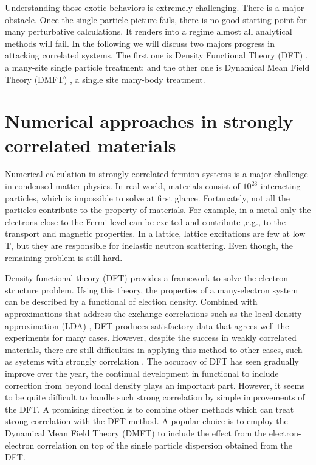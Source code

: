 Understanding those exotic behaviors is extremely challenging. There is a major
obstacle. Once the single particle picture fails, there
is no good starting point for many perturbative calculations. It renders
into a regime almost all analytical methods will fail. In the following we 
will discuss two majors progress in attacking correlated systems. The first one 
is Density Functional Theory (DFT)\cite{PhysRev.136.B864,PhysRev.140.A1133} , 
a many-site single particle treatment; 
and the other one is Dynamical Mean Field Theory (DMFT) \cite{RevModPhys.68.13,PhysRevB.45.6479,Jarrell-1992}, 
a single site many-body treatment. 

\section{Numerical approaches in strongly correlated materials}
Numerical calculation in strongly correlated fermion systems is a major 
challenge in condensed matter physics. In real world, materials consist of 
$10^{23}$ interacting particles, which is impossible to solve at first glance. 
Fortunately, not all the particles contribute to the property of materials. For 
example, in a metal only the electrons close to the Fermi level can be excited 
and contribute ,e.g., to the transport and magnetic properties. In a lattice, 
lattice excitations are few at low T, but they are responsible for inelastic 
neutron scattering. Even though, the remaining problem is still hard. 

Density functional theory (DFT)\cite{PhysRev.136.B864,PhysRev.140.A1133} 
provides a framework to solve the 
electron structure problem. Using this theory, the properties of a many-electron
system can be described by a functional of election density. Combined with 
approximations that address the exchange-correlations such as the local density 
approximation (LDA) \cite{lundqvist1983}, DFT produces satisfactory data that agrees well the 
experiments for many cases. However, despite the success in weakly correlated 
materials, there are still difficulties in applying this method to other 
cases, such as systems with strongly correlation \cite{0953-8984-9-35-010}. 
The accuracy of DFT has seen gradually improve over the year, the continual
development in functional to include correction from beyond local density 
plays an important part. However, it seems to be quite
difficult to handle such strong correlation by simple improvements of the 
DFT. A promising direction is to combine other methods which can treat
strong correlation with the DFT method. A popular choice is to employ 
the Dynamical Mean Field Theory\citep{RevModPhys.68.13,PhysRevB.45.6479} (DMFT)
to include the effect from the electron-electron
correlation on top of the single particle dispersion obtained from the DFT. 

